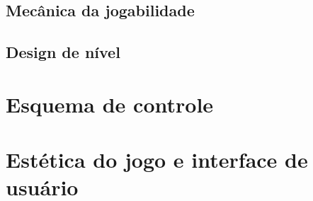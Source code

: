 \documentclass[12pt,a4paper]{article}
\begin{document}
\subsection{Mecânica da jogabilidade}





\subsection{Design de nível}



\section{Esquema de controle}



\section{Estética do jogo e interface de usuário}
\end{document}

